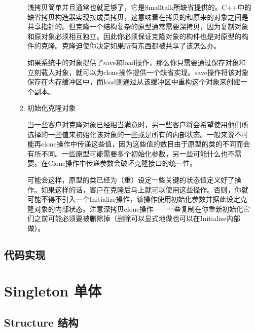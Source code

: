 \begin{enumerate}
\begin{enumerate}
	  浅拷贝简单并且通常也就足够了，它是Smalltalk所缺省提供的。C++中的缺省拷贝构造器实现按成员拷贝，这意味着在拷贝的和原来的对象之间是共享指针的。但克隆一个结构复杂的原型通常需要深拷贝，因为复制对象和原对象必须相互独立。因此你必须保证克隆对象的构件也是对原型的构件的克隆。克隆迫使你决定如果所有东西都被共享了该怎么办。

 	  如果系统中的对象提供了save和load操作，那么你只需要通过保存对象和立刻载入对象，就可以为clone操作提供一个缺省实现。save操作将该对象保存在内存缓冲区中，而load则通过从该缓冲区中重构这个对象来创建一个副本。

	  \item 初始化克隆对象

	  当一些客户对克隆对象已经相当满意时，另一些客户将会希望使用他们所选择的一些值来初始化该对象的一些或是所有的内部状态。一般来说不可能再clone操作中传递这些值，因为这些值的数目由于原型的类的不同而会有所不同。一些原型可能需要多个初始化参数，另一些可能什么也不需要。在Clone操作中传递参数会破坏克隆接口的统一性。

	  可能会这样，原型的类已经为（重）设定一些关键的状态值定义好了操作。如果这样的话，客户在克隆后马上就可以使用这些操作。否则，你就可能不得不引入一个Initialize操作，该操作使用初始化参数并据此设定克隆对象的内部状态。注意深拷贝clone操作——一些复制在你重新初始化它们之前可能必须要被删除掉（删除可以显式地做也可以在Initialize内部做）。

	  \end{enumerate}

\end{enumerate}

\subsection{代码实现}



\section{Singleton 单体}

\subsection{Structure 结构}

